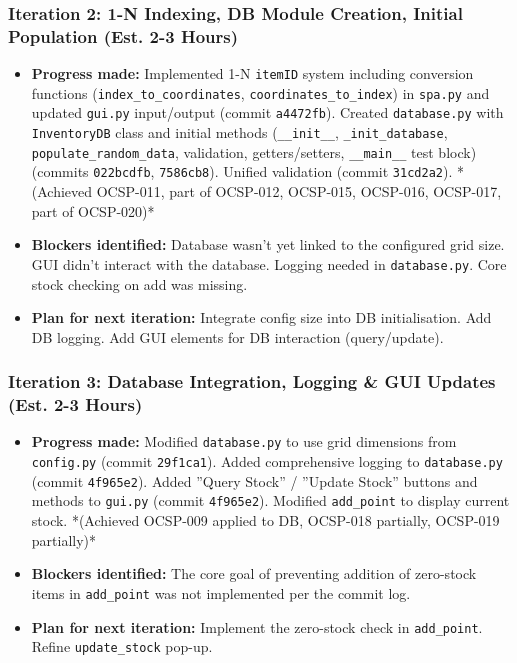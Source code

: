 \subsubsection{Iteration 2: 1-N Indexing, DB Module Creation, Initial Population (Est. 2-3 Hours)}
\begin{itemize}
	\item \textbf{Progress made:} Implemented 1-N \texttt{itemID} system including conversion functions (\texttt{index\_to\_coordinates}, \texttt{coordinates\_to\_index}) in \texttt{spa.py} and updated \texttt{gui.py} input/output (commit \texttt{a4472fb}). Created \texttt{database.py} with \texttt{InventoryDB} class and initial methods (\texttt{\_\_init\_\_}, \texttt{\_init\_database}, \texttt{populate\_random\_data}, validation, getters/setters, \texttt{\_\_main\_\_} test block) (commits \texttt{022bcdfb}, \texttt{7586cb8}). Unified validation (commit \texttt{31cd2a2}). *(Achieved OCSP-011, part of OCSP-012, OCSP-015, OCSP-016, OCSP-017, part of OCSP-020)*
	\item \textbf{Blockers identified:} Database wasn't yet linked to the configured grid size. GUI didn't interact with the database. Logging needed in \texttt{database.py}. Core stock checking on add was missing.
	\item \textbf{Plan for next iteration:} Integrate config size into DB initialisation. Add DB logging. Add GUI elements for DB interaction (query/update).
\end{itemize}

\subsubsection{Iteration 3: Database Integration, Logging \& GUI Updates (Est. 2-3 Hours)}
\begin{itemize}
	\item \textbf{Progress made:} Modified \texttt{database.py} to use grid dimensions from \texttt{config.py} (commit \texttt{29f1ca1}). Added comprehensive logging to \texttt{database.py} (commit \texttt{4f965e2}). Added ''Query Stock'' / ''Update Stock'' buttons and methods to \texttt{gui.py} (commit \texttt{4f965e2}). Modified \texttt{add\_point} to display current stock. *(Achieved OCSP-009 applied to DB, OCSP-018 partially, OCSP-019 partially)*
	\item \textbf{Blockers identified:} The core goal of preventing addition of zero-stock items in \texttt{add\_point} was not implemented per the commit log.
	\item \textbf{Plan for next iteration:} Implement the zero-stock check in \texttt{add\_point}. Refine \texttt{update\_stock} pop-up.
\end{itemize}

